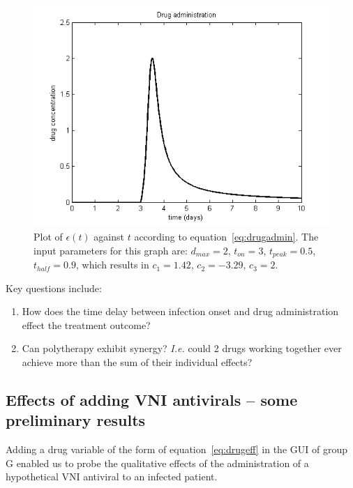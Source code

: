 \documentclass[a4paper, 12pt]{report}
\begin{document}
\begin{figure}[htb]
\begin{centering}
\includegraphics[width=150mm]{drugAdministration.png}
\caption{Plot of $\epsilon(t)$ against $t$ according to equation~\eqref{eq:drugadmin}. The input parameters for this graph are: $d_{max} = 2$, $t_{on} = 3$, $t_{peak} = 0.5$, $t_{half} = 0.9$, which results in $c_1 = 1.42$, $c_2 = -3.29$, $c_3 = 2$.}
\label{fig:DrugProfile}
\end{centering}
\end{figure}

Key questions include:
\begin{enumerate}
\item How does the time delay between infection onset and drug administration effect the treatment outcome?
\item Can polytherapy exhibit synergy? \textit{I.e.} could 2 drugs working together ever achieve more than the sum of their individual effects?
\end{enumerate}

\subsection{Effects of adding VNI antivirals -- some preliminary results}

Adding a drug variable of the form of equation~\eqref{eq:drugeff}  in the GUI of group G enabled us to probe the qualitative effects of the administration of a hypothetical VNI antiviral to an infected patient.\\
\end{document}
